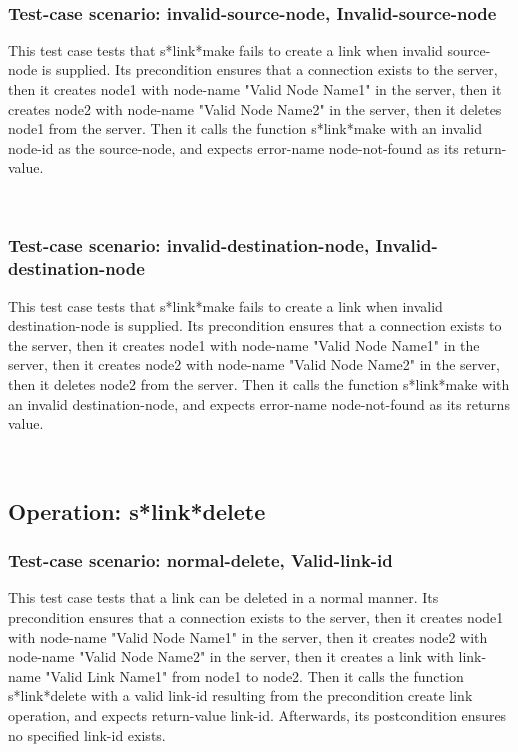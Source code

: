\
\subsubsection {Test-case scenario: invalid-source-node, Invalid-source-node}


This test case tests that s*link*make fails to create a link when invalid source-node is supplied.
Its precondition ensures that a connection exists to the server, then it creates node1 with node-name "Valid Node Name1" in the server, then it creates node2 with node-name  "Valid Node Name2" in the server, then it deletes node1 from the server.
Then it calls the function s*link*make  with an invalid node-id as the source-node, and expects error-name node-not-found as its return-value.





\
\subsubsection {Test-case scenario: invalid-destination-node, Invalid-destination-node}


This test case tests that s*link*make fails to create a link when invalid destination-node is supplied.
Its precondition ensures that a connection exists to the server, then it creates node1 with node-name "Valid Node Name1" in the server, then it creates node2 with node-name  "Valid Node Name2" in the server, then it deletes node2 from the server.
Then it calls the function s*link*make  with an invalid destination-node, and expects error-name node-not-found as its returns value.





\
\subsection {Operation: s*link*delete}
\subsubsection {Test-case scenario: normal-delete, Valid-link-id}


This test case tests that a link can be deleted in a normal manner.
Its precondition ensures that a connection exists to the server, then it creates node1 with node-name "Valid Node Name1" in the server, then it creates node2 with node-name  "Valid Node Name2" in the server, then it creates a link with link-name "Valid Link Name1" from node1 to node2.
Then it calls the function s*link*delete  with a valid link-id resulting from the precondition create link operation, and expects return-value link-id.
Afterwards, its postcondition ensures no specified link-id exists.




